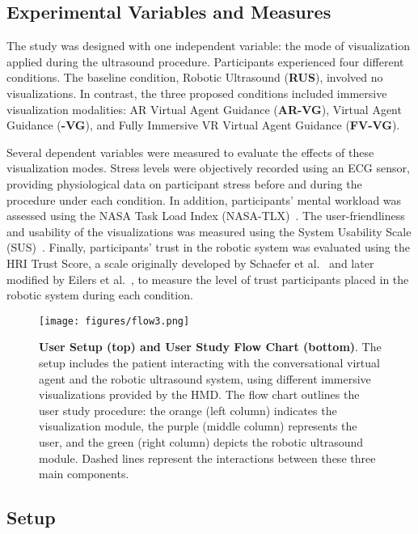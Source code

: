 \subsection{Experimental Variables and Measures}

The study was designed with one independent variable: the mode of visualization applied during the ultrasound procedure. Participants experienced four different conditions. The baseline condition, Robotic Ultrasound (\textbf{RUS}), involved no visualizations. In contrast, the three proposed conditions included immersive visualization modalities: AR Virtual Agent Guidance (\textbf{AR-VG}),  Virtual Agent Guidance (\textbf{-VG}), and Fully Immersive VR Virtual Agent Guidance (\textbf{FV-VG}).

Several dependent variables were measured to evaluate the effects of these visualization modes. Stress levels were objectively recorded using an ECG sensor, providing physiological data on participant stress before and during the procedure under each condition. In addition, participants’ mental workload was assessed using the NASA Task Load Index (NASA-TLX)~\cite{hart2006nasa}. The user-friendliness and usability of the visualizations was measured using the System Usability Scale (SUS)~\cite{brooke1996sus}. Finally, participants’ trust in the robotic system was evaluated using the HRI Trust Score, a scale originally developed by Schaefer et al.~\cite{schaefer2016measuring} and later modified by Eilers et al.~\cite{eilers2023importance}, to measure the level of trust participants placed in the robotic system during each condition.

\begin{figure}[h]
    \centering
    \texttt{[image: figures/flow3.png]}
    \caption{\textbf{User Setup (top) and User Study Flow Chart (bottom)}. The setup includes the patient interacting with the conversational virtual agent and the robotic ultrasound system, using different immersive visualizations provided by the HMD. The flow chart outlines the user study procedure: the orange (left column) indicates the visualization module, the purple (middle column) represents the user, and the green (right column) depicts the robotic ultrasound module. Dashed lines represent the interactions between these three main components.}
    \label{fig:flow}
\end{figure}


\subsection{Setup}

